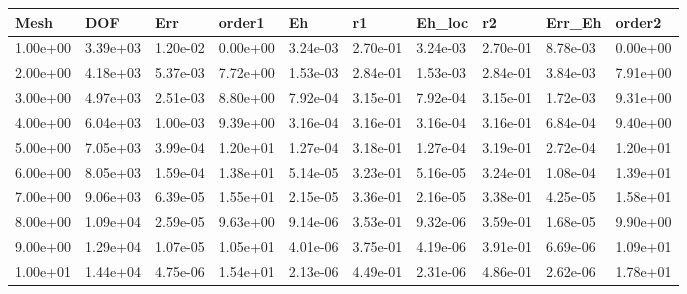 \begin{tabular}{llllllllll}
Mesh & DOF & Err & order1 & Eh & r1 & Eh_loc & r2 & Err_Eh & order2 \\ 
\hline 
1.00e+00 & 3.39e+03 & 1.20e-02 & 0.00e+00 & 3.24e-03 & 2.70e-01 & 3.24e-03 & 2.70e-01 & 8.78e-03 & 0.00e+00 \\ 
2.00e+00 & 4.18e+03 & 5.37e-03 & 7.72e+00 & 1.53e-03 & 2.84e-01 & 1.53e-03 & 2.84e-01 & 3.84e-03 & 7.91e+00 \\ 
3.00e+00 & 4.97e+03 & 2.51e-03 & 8.80e+00 & 7.92e-04 & 3.15e-01 & 7.92e-04 & 3.15e-01 & 1.72e-03 & 9.31e+00 \\ 
4.00e+00 & 6.04e+03 & 1.00e-03 & 9.39e+00 & 3.16e-04 & 3.16e-01 & 3.16e-04 & 3.16e-01 & 6.84e-04 & 9.40e+00 \\ 
5.00e+00 & 7.05e+03 & 3.99e-04 & 1.20e+01 & 1.27e-04 & 3.18e-01 & 1.27e-04 & 3.19e-01 & 2.72e-04 & 1.20e+01 \\ 
6.00e+00 & 8.05e+03 & 1.59e-04 & 1.38e+01 & 5.14e-05 & 3.23e-01 & 5.16e-05 & 3.24e-01 & 1.08e-04 & 1.39e+01 \\ 
7.00e+00 & 9.06e+03 & 6.39e-05 & 1.55e+01 & 2.15e-05 & 3.36e-01 & 2.16e-05 & 3.38e-01 & 4.25e-05 & 1.58e+01 \\ 
8.00e+00 & 1.09e+04 & 2.59e-05 & 9.63e+00 & 9.14e-06 & 3.53e-01 & 9.32e-06 & 3.59e-01 & 1.68e-05 & 9.90e+00 \\ 
9.00e+00 & 1.29e+04 & 1.07e-05 & 1.05e+01 & 4.01e-06 & 3.75e-01 & 4.19e-06 & 3.91e-01 & 6.69e-06 & 1.09e+01 \\ 
1.00e+01 & 1.44e+04 & 4.75e-06 & 1.54e+01 & 2.13e-06 & 4.49e-01 & 2.31e-06 & 4.86e-01 & 2.62e-06 & 1.78e+01 \\ 
\hline 
\end{tabular}